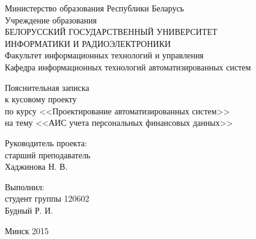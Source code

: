\begin{titlepage}
\thispagestyle{empty}
\setlength{\parindent}{0mm} %

\begin{center}
  Министерство образования Республики Беларусь \\
  \smallskip
  Учреждение образования \\
  БЕЛОРУССКИЙ ГОСУДАРСТВЕННЫЙ УНИВЕРСИТЕТ \\
  ИНФОРМАТИКИ И РАДИОЭЛЕКТРОНИКИ \\
  \smallskip
  Факультет информационных технологий и управления \\
  \smallskip
  Кафедра информационных технологий автоматизированных систем
\end{center}

\vspace{50mm}

\begin{center}
  Пояснительная записка \\
  к кусовому проекту \\
  по курсу <<Проектирование автоматизированных систем>> \\
  на тему
  <<АИС учета персональных финансовых данных>> \\
\end{center}

\vspace{20mm}

\begin{minipage}{.45\linewidth}
    Руководитель проекта: \\
    старший преподаватель \\
    Хаджинова Н. В.
\end{minipage}
\hfill
\begin{minipage}{.45\linewidth}
  \begin{flushright}
    Выполнил: \\
    студент группы 120602 \\
    Будный Р. И.
  \end{flushright}
\end{minipage}

\vspace{70mm}
\begin{center}
  Минск 2015
\end{center}

\setlength{\parindent}{5ex} %
\end{titlepage}